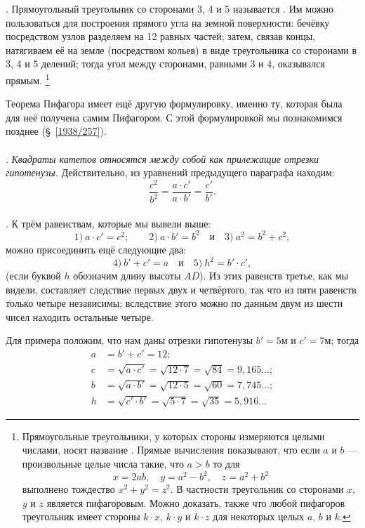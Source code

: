 \documentclass[twoside]{book}
\begin{document}
\smallskip
{}.
Прямоугольный треугольник со сторонами 3, 4 и 5 называется . 
Им можно пользоваться для построения прямого угла на земной поверхности:
бечёвку посредством узлов разделяем на 12 равных частей;
затем, связав концы, натягиваем её на земле (посредством кольев) в виде треугольника со сторонами в 3, 4 и 5 делений;
тогда угол между сторонами, равными 3 и 4, оказывался прямым.%
\footnote{Прямоугольные треугольники, у которых стороны измеряются целыми числами, носят название .
Прямые вычисления показывают, что если $a$ и $b$ — произвольные целые числа такие, что $a>b$ то для
\[x=2ab,
\quad
y=a^2-b^2,
\quad
z=a^2+b^2\]
выполнено тождество $x^2+y^2=z^2$.
В частности треугольник со сторонами $x$, $y$ и $z$ является пифагоровым.
Можно доказать, также что любой пифагоров треугольник имеет стороны $k{\cdot}x$, $k{\cdot}y$ и $k{\cdot}z$ для некоторых целых $a$, $b$ и $k$. %
}

Теорема Пифагора имеет ещё другую формулировку, именно ту, которая была для неё получена самим Пифагором.
С этой формулировкой мы познакомимся позднее (§~\ref{1938/257}).

\paragraph{}\label{1938/192}
.
\emph{Квадраты катетов относятся между собой как прилежащие отрезки гипотенузы.}
Действительно, из уравнений предыдущего параграфа находим:
\[\frac{c^2}{b^2}=\frac{a\cdot c'}{a\cdot b'}=\frac{c'}{b'}.\]

\paragraph{}\label{1938/193}
.
К трём равенствам, которые мы вывели выше:
\[1)\ a\cdot c'=c^2;
\qquad
2)\ a\cdot b'=b^2
\quad
\text{и}
\quad
3)\ a^2=b^2+c^2,
\]
можно присоединить ещё следующие два:
\[4)\ b'+c'=a
\quad
\text{и}
\quad
5)\ h^2=b'\cdot c',
\]
(если буквой $h$ обозначим длину высоты $AD$).
Из этих равенств третье, как мы видели, составляет следствие первых двух и четвёртого, так что из пяти равенств только четыре независимы;
вследствие этого можно по данным двум из шести чисел находить остальные четыре.

Для примера положим, что нам даны отрезки гипотенузы $b' = 5 \text{м}$ и $c' = 7\text{м}$;
тогда
\begin{align*}
a&=b'+c'=12;
\\
c&=\sqrt{a\cdot c'}=
\sqrt{12\cdot 7}=
\sqrt{84}=9{,}165\dots;
\\
b&=\sqrt{a\cdot b'}=\sqrt{12\cdot 5}=\sqrt{60}=7{,}745\dots;
\\
h&=\sqrt{c'\cdot b'}=\sqrt{5\cdot 7}=\sqrt{35} = 5{,}916\dots
\end{align*}
\end{document}

